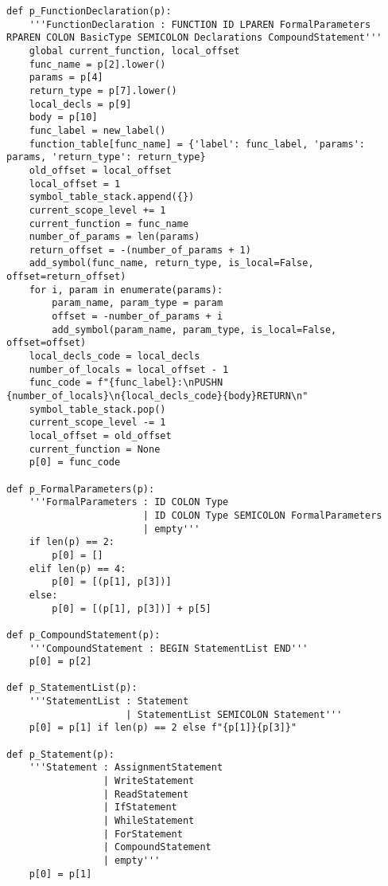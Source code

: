 \documentclass[12pt,a4paper]{report}%
\begin{document}
\begin{lstlisting}[style=pythonStyle, caption={Ficheiro lex.py}]
def p_FunctionDeclaration(p):
    '''FunctionDeclaration : FUNCTION ID LPAREN FormalParameters RPAREN COLON BasicType SEMICOLON Declarations CompoundStatement'''
    global current_function, local_offset
    func_name = p[2].lower()
    params = p[4]
    return_type = p[7].lower()
    local_decls = p[9]
    body = p[10]
    func_label = new_label()
    function_table[func_name] = {'label': func_label, 'params': params, 'return_type': return_type}
    old_offset = local_offset
    local_offset = 1
    symbol_table_stack.append({})
    current_scope_level += 1
    current_function = func_name
    number_of_params = len(params)
    return_offset = -(number_of_params + 1)
    add_symbol(func_name, return_type, is_local=False, offset=return_offset)
    for i, param in enumerate(params):
        param_name, param_type = param
        offset = -number_of_params + i
        add_symbol(param_name, param_type, is_local=False, offset=offset)
    local_decls_code = local_decls
    number_of_locals = local_offset - 1
    func_code = f"{func_label}:\nPUSHN {number_of_locals}\n{local_decls_code}{body}RETURN\n"
    symbol_table_stack.pop()
    current_scope_level -= 1
    local_offset = old_offset
    current_function = None
    p[0] = func_code

def p_FormalParameters(p):
    '''FormalParameters : ID COLON Type
                        | ID COLON Type SEMICOLON FormalParameters
                        | empty'''
    if len(p) == 2:
        p[0] = []
    elif len(p) == 4:
        p[0] = [(p[1], p[3])]
    else:
        p[0] = [(p[1], p[3])] + p[5]

def p_CompoundStatement(p):
    '''CompoundStatement : BEGIN StatementList END'''
    p[0] = p[2]

def p_StatementList(p): 
    '''StatementList : Statement
                     | StatementList SEMICOLON Statement'''
    p[0] = p[1] if len(p) == 2 else f"{p[1]}{p[3]}"

def p_Statement(p):
    '''Statement : AssignmentStatement
                 | WriteStatement
                 | ReadStatement
                 | IfStatement
                 | WhileStatement
                 | ForStatement
                 | CompoundStatement
                 | empty'''
    p[0] = p[1]


\end{lstlisting}
\end{document}
